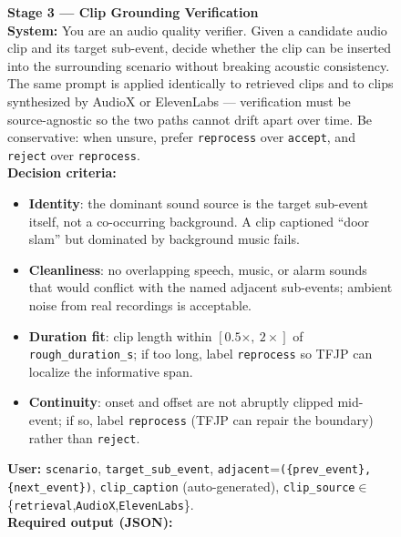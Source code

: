 \documentclass{article}
\begin{document}
\begin{figure}[H]
\centering
\begin{tcolorbox}[
  colback=promptbg, colbacktitle=promptbg, colframe=promptframe,
  coltitle=black,
  title=\textbf{Prompt Template (Hierarchical Event Curation, Part 2)},
  fonttitle=\bfseries,
  boxrule=0.5pt, arc=2pt,
  fontupper=\scriptsize,
  left=8pt, right=8pt, top=4pt, bottom=4pt
]
\textbf{Stage 3 --- Clip Grounding Verification}\\[1pt]
\textbf{System:} You are an audio quality verifier. Given a candidate
audio clip and its target sub-event, decide whether the clip can be
inserted into the surrounding scenario without breaking acoustic
consistency. The same prompt is applied identically to retrieved clips
and to clips synthesized by AudioX or ElevenLabs --- verification must
be source-agnostic so the two paths cannot drift apart over time. Be
conservative: when unsure, prefer \texttt{reprocess} over
\texttt{accept}, and \texttt{reject} over \texttt{reprocess}.\\[2pt]
\textbf{Decision criteria:}
\begin{itemize}\setlength\itemsep{0pt}\setlength\topsep{0pt}
  \item \textbf{Identity}: the dominant sound source is the target
        sub-event itself, not a co-occurring background. A clip
        captioned ``door slam'' but dominated by background music fails.
  \item \textbf{Cleanliness}: no overlapping speech, music, or alarm
        sounds that would conflict with the named adjacent sub-events;
        ambient noise from real recordings is acceptable.
  \item \textbf{Duration fit}: clip length within
        $[0.5\times,\ 2\times]$ of \texttt{rough\_duration\_s}; if too
        long, label \texttt{reprocess} so TFJP can localize the
        informative span.
  \item \textbf{Continuity}: onset and offset are not abruptly clipped
        mid-event; if so, label \texttt{reprocess} (TFJP can repair the
        boundary) rather than \texttt{reject}.
\end{itemize}
\textbf{User:} \texttt{scenario}, \texttt{target\_sub\_event},
\texttt{adjacent}=\verb|({prev_event},{next_event})|,
\texttt{clip\_caption} (auto-generated),
\texttt{clip\_source}$\in$\{\verb|retrieval|,\verb|AudioX|,\verb|ElevenLabs|\}.\\[2pt]
\textbf{Required output (JSON):}
\begin{itemize}\setlength\itemsep{0pt}\setlength\topsep{0pt}

\end{itemize}
\end{tcolorbox}
\end{figure}
\end{document}
